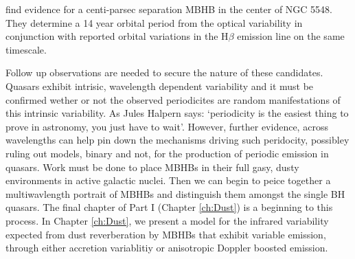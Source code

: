 \citep{LiWang:2016} find evidence for a centi-parsec separation MBHB in the
center of NGC 5548. They determine a 14 year orbital period from the optical
variability in conjunction with reported orbital variations in the H$\beta$
emission line on the same timescale.



Follow up observations are needed to secure the nature of these candidates.
Quasars exhibit intrisic, wavelength dependent variability \citep{QuasVar} and
it must be confirmed wether or not the observed periodicites are random
manifestations of this intrinsic variability. As Jules Halpern says:
`periodicity is the easiest thing to prove in astronomy, you just have to
wait'. However, further evidence, across wavelengths can help pin down the
mechanisms driving such peridocity, possibley ruling out models, binary and
not, for the production of periodic emission in quasars. Work must be done to
place MBHBs in their full gasy, dusty environments in active galactic nuclei.
Then we can begin to peice together a multiwavlength portrait of MBHBs and
distinguish them amongst the single BH quasars. The final chapter of Part I
(Chapter \ref{ch:Dust}) is a beginning to this process. In Chapter
\ref{ch:Dust}, we present a model for the infrared variability expected from
dust reverberation by MBHBs that exhibit variable emission, through either
accretion variablitiy or anisotropic Doppler boosted emission.









	
	


